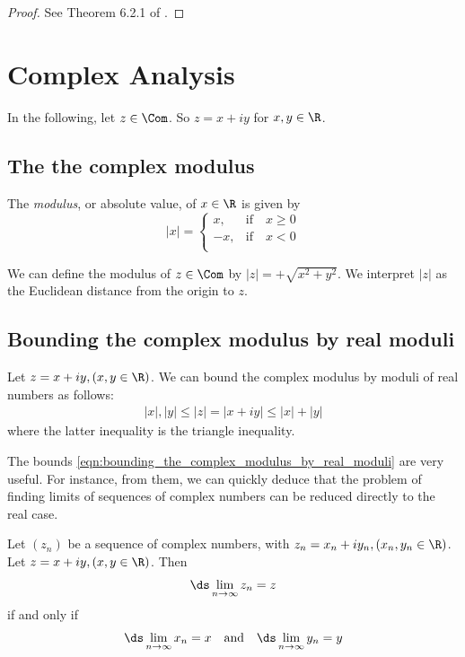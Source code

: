 \documentclass{article} %
\begin{document}
\begin{proof}
See Theorem 6.2.1 of \cite{strichartz2000way}.	
\end{proof}

\section{Complex Analysis}

In the following, let $z \in \Com$. So $z = x+iy$ for $x,y \in \R$.  

\subsection{The the complex modulus} 

The \textit{modulus}, or absolute value, of $x \in \R$ is given by 
\[ |x| = 
\begin{cases}
x, & \text{if} \quad  x\geq 0 \\
-x, & \text{if} \quad x<0 \\ 	
\end{cases}
 \]

We can define the modulus of $z \in \Com$ by $|z| = + \sqrt{x^2 + y^2}$.   We interpret $|z|$ as the Euclidean distance from the origin to $z$. 

\subsection{Bounding the complex modulus by real moduli} 

 Let $z=x+iy, 	(x, y \in \R)$.   We can bound the complex modulus by moduli of real numbers as follows:
%
\begin{align}
|x|, |y| \leq |z|=|x+iy| \leq |x|+|y|
\label{eqn:bounding_the_complex_modulus_by_real_moduli_appendix} 
\end{align}
where the latter inequality is the triangle inequality. 

The bounds \eqref{eqn:bounding_the_complex_modulus_by_real_moduli}  are very useful.  For instance, from them, we can quickly deduce that the problem of finding limits of sequences of complex numbers can be reduced directly to the real case.

\begin{lemma}
\cite[Lemma~3.2]{stewart2018complex} Let $(z_n)$ be a sequence of complex numbers, with $z_n = x_n + i y_n, (x_n, y_n \in \R)$.  Let $z=x+iy, 	(x, y \in \R)$.  Then 
\[ \ds\lim_{n \to \infty} z_n = z\]
if and only if 
\[ \ds\lim_{n \to \infty} x_n = x \quad \text{and} \quad \ds\lim_{n \to \infty} y_n = y\]
\end{lemma}
\end{document}

